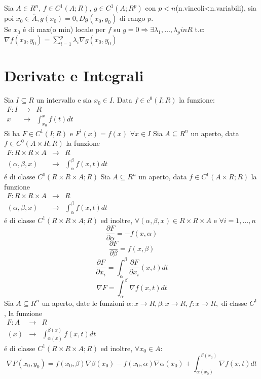 Sia $A\in R^n$, $f\in C^1(A;R)$, $g\in C^1(A;R^p)$ con $p<n$(n.vincoli<n.variabili), sia poi $x_0\in\overset{\circ}{A}, g(x_0)=0, Dg (x_0,y_0)$ di rango $p$.\\
Se $x_0$ \'e di max(o min) locale per $f$ su $g=0\Rightarrow\exists \lambda_1,\ldots,\lambda_p in R$ t.c: $\nabla f(x_0,y_0) = \sum\limits_{i=1}^{p}\lambda_i\nabla g(x_0,y_0)$\\
\section{Derivate e Integrali}
Sia $I\subseteq R$ un intervallo e sia $x_0\in I$. Data $f\in c^0(I;R)$ la funzione:\\
$\begin{array}{rcl} F: I & \to & R \\ x & \to & \int_{x_0}^{x}f(t)dt \end{array}$\\
Si ha $F\in C^1(I;R)$ e $F^{'}(x)=f(x)$ $\forall x \in I$
\proposition
Sia $A\subseteq R^n$ un aperto, data $f\in C^0(A\times R;R)$ la funzione \\
$\begin{array}{rcl} F: R\times R\times A & \to & R \\ (\alpha,\beta,x) & \to & \int_{\alpha}^{\beta}f(x,t)dt \end{array}$\\
\'e di classe $C^0(R\times R\times A;R)$
\proposition
Sia $A\subseteq R^n$ un aperto, data $f\in C^1(A\times R;R)$ la funzione \\
$\begin{array}{rcl} F: R\times R\times A & \to & R \\ (\alpha,\beta,x) & \to & \int_{\alpha}^{\beta}f(x,t)dt \end{array}$\\
\'e di classe $C^1(R\times R\times A;R)$ ed inoltre, $\forall (\alpha,\beta,x)\in R\times R\times A$ e $\forall i=1,\ldots,n$\\
$$\frac{\partial F}{\partial \alpha}=-f(x,\alpha)$$
$$\frac{\partial F}{\partial \beta}=f(x,\beta)$$
$$\frac{\partial F}{\partial x_i}=\int_{\alpha}^{\beta}\frac{\partial F}{\partial x_i}(x,t)dt$$
$$\nabla F=\int_{\alpha}^{\beta}\nabla f(x,t)dt$$
\corollary
Sia $A\subseteq R^n$ un aperto, date le funzioni $\alpha:x\rightarrow R, \beta:x\rightarrow R, f:x\rightarrow R, $ di classe $C^1$ , la funzione \\
$\begin{array}{rcl} F: A & \to & R \\ (x) & \to & \int_{\alpha(x)}^{\beta(x)}f(x,t)dt \end{array}$\\
\'e di classe $C^1(R\times R\times A;R)$ ed inoltre, $\forall x_0 \in A$:
$$\nabla F(x_0,y_0)=f(x_0,\beta)\nabla\beta(x_0)-f(x_0,\alpha)\nabla\alpha(x_0)+\int_{\alpha(x_0)}^{\beta(x_0)}\nabla f(x,t)dt$$


